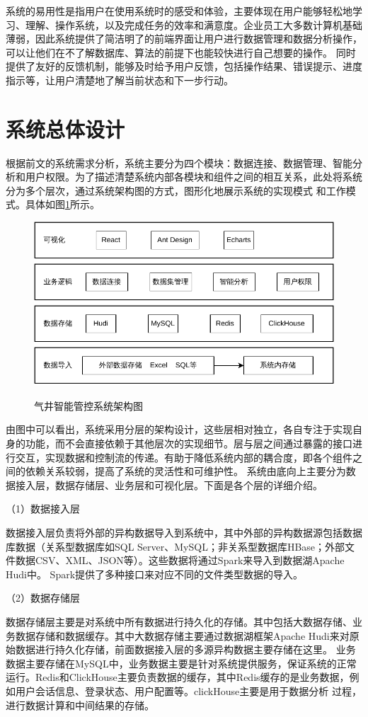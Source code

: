 系统的易用性是指用户在使用系统时的感受和体验，主要体现在用户能够轻松地学习、理解、操作系统，以及完成任务的效率和满意度。企业员工大多数计算机基础薄弱，因此系统提供了简洁明了的前端界面让用户进行数据管理和数据分析操作，可以让他们在不了解数据库、算法的前提下也能较快进行自己想要的操作。
同时提供了友好的反馈机制，能够及时给予用户反馈，包括操作结果、错误提示、进度指示等，让用户清楚地了解当前状态和下一步行动。
\section{系统总体设计}
根据前文的系统需求分析，系统主要分为四个模块：数据连接、数据管理、智能分析和用户权限。为了描述清楚系统内部各模块和组件之间的相互关系，此处将系统分为多个层次，通过系统架构图的方式，图形化地展示系统的实现模式
和工作模式。具体如图\ref{fig:sysstruc}所示。
\begin{figure}[H]
    \centering
    \caption{气井智能管控系统架构图}
    \includegraphics{figure/系统架构图.pdf}
    \label{fig:sysstruc}
\end{figure}
由图中可以看出，系统采用分层的架构设计，这些层相对独立，各自专注于实现自身的功能，而不会直接依赖于其他层次的实现细节。层与层之间通过暴露的接口进行交互，实现数据和控制流的传递。有助于降低系统内部的耦合度，即各个组件之间的依赖关系较弱，提高了系统的灵活性和可维护性。
系统由底向上主要分为数据接入层，数据存储层、业务层和可视化层。下面是各个层的详细介绍。

（1）数据接入层

数据接入层负责将外部的异构数据导入到系统中，其中外部的异构数据源包括数据库数据（关系型数据库如SQL Server、MySQL；非关系型数据库HBase；外部文件数据CSV、XML、JSON等）。这些数据将通过Spark来导入到数据湖Apache Hudi中。
Spark提供了多种接口来对应不同的文件类型数据的导入。

（2）数据存储层

数据存储层主要是对系统中所有数据进行持久化的存储。其中包括大数据存储、业务数据存储和数据缓存。其中大数据存储主要通过数据湖框架Apache Hudi来对原始数据进行持久化存储，前面数据接入层的多源异构数据主要存储在这里。
业务数据主要存储在MySQL中，业务数据主要是针对系统提供服务，保证系统的正常运行。Redis和ClickHouse主要负责数据的缓存，其中Redis缓存的是业务数据，例如用户会话信息、登录状态、用户配置等。clickHouse主要是用于数据分析
过程，进行数据计算和中间结果的存储。

